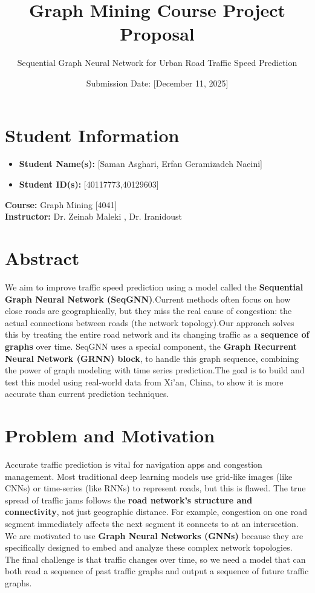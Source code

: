 \documentclass[11pt, a4paper]{article}
\title{\textbf{Graph Mining Course Project Proposal}}
\author{Sequential Graph Neural Network for Urban Road Traffic Speed Prediction}
\date{Submission Date: [December 11, 2025]}
\begin{document}
\maketitle

\section*{Student Information}
\begin{itemize}
    \item \textbf{Student Name(s):} [Saman Asghari, Erfan Geramizadeh Naeini]
    \item \textbf{Student ID(s):} [40117773,40129603]
\end{itemize}
\vspace{0.5cm}

\noindent\textbf{Course:} Graph Mining [4041] \\
\noindent\textbf{Instructor:} Dr. Zeinab Maleki , Dr. Iranidoust
\vspace{0.5cm}

\section*{Abstract}
We aim to improve traffic speed prediction using a model called the \textbf{Sequential Graph Neural Network (SeqGNN)}.Current methods often focus on how close roads are geographically, but they miss the real cause of congestion: the actual connections between roads (the network topology).Our approach solves this by treating the entire road network and its changing traffic as a \textbf{sequence of graphs} over time. SeqGNN uses a special component, the \textbf{Graph Recurrent Neural Network (GRNN) block}, to handle this graph sequence, combining the power of graph modeling with time series prediction.The goal is to build and test this model using real-world data from Xi'an, China, to show it is more accurate than current prediction techniques.

\section*{Problem and Motivation}
Accurate traffic prediction is vital for navigation apps and congestion management. Most traditional deep learning models use grid-like images (like CNNs) or time-series (like RNNs) to represent roads, but this is flawed. The true spread of traffic jams follows the \textbf{road network's structure and connectivity}, not just geographic distance. For example, congestion on one road segment immediately affects the next segment it connects to at an intersection. We are motivated to use \textbf{Graph Neural Networks (GNNs)} because they are specifically designed to embed and analyze these complex network topologies. The final challenge is that traffic changes over time, so we need a model that can both read a sequence of past traffic graphs and output a sequence of future traffic graphs.
\end{document}
